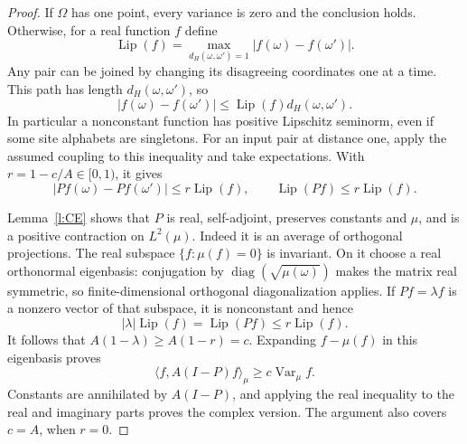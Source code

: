 \begin{proof}
If \(\Omega\) has one point, every variance is zero and the conclusion
holds.  Otherwise, for a real function \(f\) define
\[
 \operatorname{Lip}(f)=
   \max_{d_H(\omega,\omega')=1}|f(\omega)-f(\omega')|.
\]
Any pair can be joined by changing its disagreeing coordinates one at
a time.  This path has length \(d_H(\omega,\omega')\), so
\[
 |f(\omega)-f(\omega')|
            \le\operatorname{Lip}(f)d_H(\omega,\omega').
\]
In particular a nonconstant function has positive Lipschitz seminorm,
even if some site alphabets are singletons.  For an input pair at
distance one, apply the assumed coupling to this inequality and take
expectations.  With \(r=1-c/A\in[0,1)\), it gives
\[
 |Pf(\omega)-Pf(\omega')|\le r\operatorname{Lip}(f),
 \qquad \operatorname{Lip}(Pf)\le r\operatorname{Lip}(f).
\]

Lemma~\ref{l:CE} shows that \(P\) is real, self-adjoint, preserves
constants and \(\mu\), and is a positive contraction on \(L^2(\mu)\).
Indeed it is an average of orthogonal projections.  The real subspace
\(\{f:\mu(f)=0\}\) is invariant.  On it choose a real orthonormal
eigenbasis: conjugation by
\(\operatorname{diag}(\sqrt{\mu(\omega)})\) makes the matrix real
symmetric, so finite-dimensional orthogonal diagonalization applies.
If \(Pf=\lambda f\) is a nonzero vector of that subspace, it is
nonconstant and hence
\[
 |\lambda|\operatorname{Lip}(f)
       =\operatorname{Lip}(Pf)\le r\operatorname{Lip}(f).
\]
It follows that \(A(1-\lambda)\ge A(1-r)=c\).
Expanding \(f-\mu(f)\) in this eigenbasis proves
\[
 \langle f,A(I-P)f\rangle_\mu\ge c\operatorname{Var}_\mu f.
\]
Constants are annihilated by \(A(I-P)\), and applying the real
inequality to the real and imaginary parts proves the complex version.
The argument also covers \(c=A\), when \(r=0\).
\end{proof}

